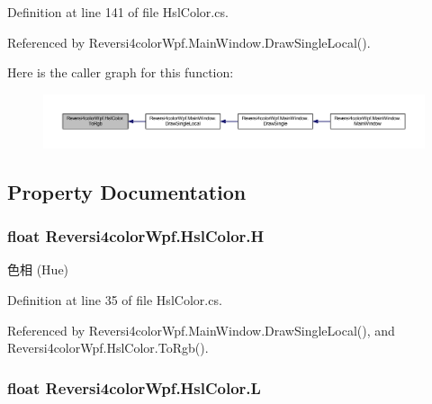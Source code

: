 Definition at line 141 of file Hsl\+Color.\+cs.



Referenced by Reversi4color\+Wpf.\+Main\+Window.\+Draw\+Single\+Local().



Here is the caller graph for this function\+:
\nopagebreak
\begin{figure}[H]
\begin{center}
\leavevmode
\includegraphics[width=350pt]{class_reversi4color_wpf_1_1_hsl_color_a7b0fd43bbad55f9f383cceeda28e9103_icgraph}
\end{center}
\end{figure}




\subsection{Property Documentation}
\subsubsection[{\texorpdfstring{H}{H}}]{\setlength{\rightskip}{0pt plus 5cm}float Reversi4color\+Wpf.\+Hsl\+Color.\+H\hspace{0.3cm}{\ttfamily [get]}}\hypertarget{class_reversi4color_wpf_1_1_hsl_color_a0dcab06abe9e65d4966271c908f9c7e9}{}\label{class_reversi4color_wpf_1_1_hsl_color_a0dcab06abe9e65d4966271c908f9c7e9}


色相 (Hue) 



Definition at line 35 of file Hsl\+Color.\+cs.



Referenced by Reversi4color\+Wpf.\+Main\+Window.\+Draw\+Single\+Local(), and Reversi4color\+Wpf.\+Hsl\+Color.\+To\+Rgb().

\subsubsection[{\texorpdfstring{L}{L}}]{\setlength{\rightskip}{0pt plus 5cm}float Reversi4color\+Wpf.\+Hsl\+Color.\+L\hspace{0.3cm}{\ttfamily [get]}}\hypertarget{class_reversi4color_wpf_1_1_hsl_color_a0438ecdd010e619e945f496660c0375d}{}\label{class_reversi4color_wpf_1_1_hsl_color_a0438ecdd010e619e945f496660c0375d}



